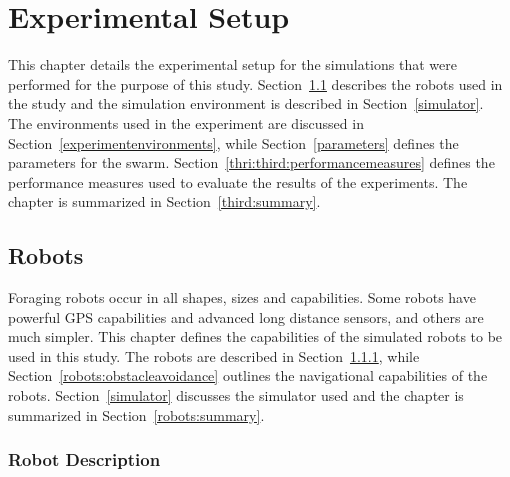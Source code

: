 
\chapter{Experimental Setup}
\label{chap:third}


This chapter details the experimental setup for the simulations that were performed for the purpose of this study. Section~\ref{chap:robots} describes the robots used in the study and the simulation environment is described in Section~\ref{simulator}. The environments used in the experiment are discussed in Section~\ref{experimentenvironments}, while Section~\ref{parameters} defines the parameters for the swarm. Section~\ref{thri:third:performancemeasures} defines the performance measures used to evaluate the results of the experiments. The chapter is summarized in Section~\ref{third:summary}.


\section{Robots}
\label{chap:robots}

Foraging robots occur in all shapes, sizes and capabilities. Some robots have powerful GPS capabilities and advanced long distance sensors, and others are much simpler. This chapter defines the capabilities of the simulated robots to be used in this study. The robots are described in Section~\ref{robotdescription}, while Section~\ref{robots:obstacleavoidance} outlines the navigational capabilities of the robots. Section~\ref{simulator} discusses the simulator used and the chapter is summarized in Section~\ref{robots:summary}.

\subsection{Robot Description}
\label{robotdescription}

